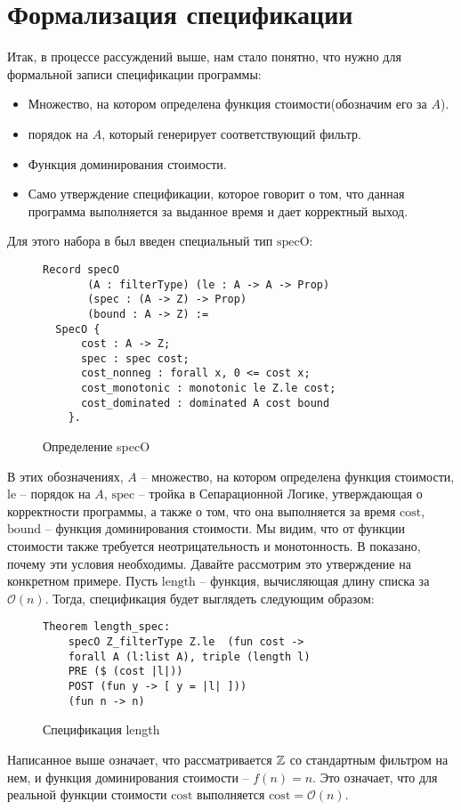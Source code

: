\section{Формализация спецификации}
Итак, в процессе рассуждений выше, нам стало понятно, что нужно для формальной записи спецификации программы:
\begin{itemize}
	\item Множество, на котором определена функция стоимости(обозначим его за $A$).
	\item порядок на $A$, который генерирует соответствующий фильтр.
	\item Функция доминирования стоимости.
	\item Само утверждение спецификации, которое говорит о том, что данная программа выполняется за выданное время и дает корректный выход.
\end{itemize}
Для этого набора в \cite{base_article} был введен специальный тип $\text{specO}$:

\begin{figure}[H]
	\caption{Определение specO}
	\label{code:specO}
	\begin{verbatim}
Record specO
       (A : filterType) (le : A -> A -> Prop)
       (spec : (A -> Z) -> Prop)
       (bound : A -> Z) :=
  SpecO {
      cost : A -> Z;
      spec : spec cost;
      cost_nonneg : forall x, 0 <= cost x;
      cost_monotonic : monotonic le Z.le cost;
      cost_dominated : dominated A cost bound
    }.
  \end{verbatim}
\end{figure}
В этих обозначениях, $A$ -- множество, на котором определена функция стоимости, $\text{le}$ -- порядок на $A$, $\text{spec}$ --
тройка в Сепарационной Логике, утверждающая о корректности программы, а также о том, что она выполняется за время $\text{cost}$,
$\text{bound}$ -- функция доминирования стоимости. Мы видим, что от функции стоимости также требуется неотрицательность и монотонность.
В \cite{base_article} показано, почему эти условия необходимы. Давайте рассмотрим это утверждение на конкретном примере.
Пусть $\text{length}$ -- функция, вычисляющая длину списка за $\mathcal{O}(n)$. Тогда, спецификация будет выглядеть следующим образом:

\begin{figure}[H]
	\caption{Спецификация length}
	\label{code:length_spec}
	\begin{verbatim}
Theorem length_spec:
	specO Z_filterType Z.le  (fun cost ->
	forall A (l:list A), triple (length l)
	PRE ($ (cost |l|))
	POST (fun y -> [ y = |l| ]))
	(fun n -> n)
  \end{verbatim}
\end{figure}

Написанное выше означает, что рассматривается $\mathbb{Z}$ со стандартным фильтром на нем, и функция доминирования стоимости -- $f(n) = n$. Это означает, что
для реальной функции стоимости $\text{cost}$ выполняется $\text{cost} = \mathcal{O}(n)$.